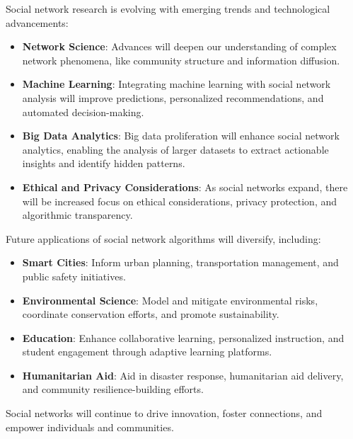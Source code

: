 \documentclass[12pt]{book} %
\begin{document}
Social network research is evolving with emerging trends and technological advancements:

\begin{itemize}
    \item \textbf{Network Science}: Advances will deepen our understanding of complex network phenomena, like community structure and information diffusion.
    
    \item \textbf{Machine Learning}: Integrating machine learning with social network analysis will improve predictions, personalized recommendations, and automated decision-making.
    
    \item \textbf{Big Data Analytics}: Big data proliferation will enhance social network analytics, enabling the analysis of larger datasets to extract actionable insights and identify hidden patterns.
    
    \item \textbf{Ethical and Privacy Considerations}: As social networks expand, there will be increased focus on ethical considerations, privacy protection, and algorithmic transparency.
\end{itemize}

Future applications of social network algorithms will diversify, including:

\begin{itemize}
    \item \textbf{Smart Cities}: Inform urban planning, transportation management, and public safety initiatives.
    
    \item \textbf{Environmental Science}: Model and mitigate environmental risks, coordinate conservation efforts, and promote sustainability.
    
    \item \textbf{Education}: Enhance collaborative learning, personalized instruction, and student engagement through adaptive learning platforms.
    
    \item \textbf{Humanitarian Aid}: Aid in disaster response, humanitarian aid delivery, and community resilience-building efforts.
\end{itemize}

Social networks will continue to drive innovation, foster connections, and empower individuals and communities.
\end{document}
